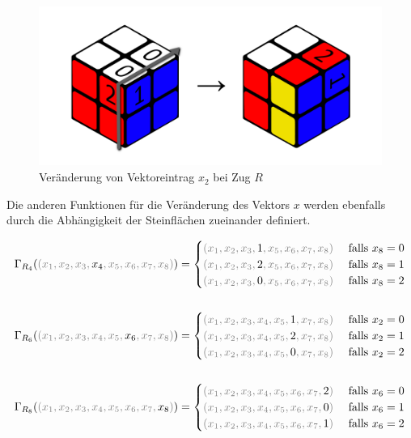 \documentclass[12pt,a4paper, usenames, dvipsnames]{article}
\theoremstyle{mystyle}
\theoremstyle{definition}
\begin{document}
\begin{figure}[H]
\centering
\includegraphics[scale=0.13]{UebergangsfunktionR.png}
\caption{Veränderung von Vektoreintrag $x_2$ bei Zug $R$}
\label{Abbildung_UebergangsfunktionR}
\end{figure}

Die anderen Funktionen für die Veränderung des Vektors $x$ werden ebenfalls durch die Abhängigkeit der Steinflächen zueinander definiert.

\begin{align*}
\Gamma_{R_4}(\textcolor{gray}{(x_1, x_2, x_3, \textcolor{black}{x_4}, x_5, x_6, x_7, x_8  )})= \begin{cases}
\textcolor{gray}{(x_1, x_2, x_3, \textcolor{black}{1}, x_5, x_6, x_7, x_8  )} & \ \text{falls } x_8 = 0 \\ 
\textcolor{gray}{(x_1, x_2, x_3, \textcolor{black}{2}, x_5, x_6, x_7, x_8  )} & \ \text{falls } x_8 = 1 \\
\textcolor{gray}{(x_1, x_2, x_3, \textcolor{black}{0}, x_5, x_6, x_7, x_8  )} & \ \text{falls } x_8 = 2 
\end{cases} \\
\\
\Gamma_{R_6}(\textcolor{gray}{(x_1, x_2, x_3, x_4, x_5, \textcolor{black}{x_6}, x_7, x_8  )})= \begin{cases}
\textcolor{gray}{(x_1, x_2, x_3, x_4, x_5, \textcolor{black}{1}, x_7, x_8  )} & \ \text{falls } x_2 = 0 \\ 
\textcolor{gray}{(x_1, x_2, x_3, x_4, x_5, \textcolor{black}{2}, x_7, x_8  )} & \ \text{falls } x_2 = 1 \\
\textcolor{gray}{(x_1, x_2, x_3, x_4, x_5, \textcolor{black}{0}, x_7, x_8  )} & \ \text{falls } x_2 = 2 
\end{cases} \\
\\
\Gamma_{R_8}(\textcolor{gray}{(x_1, x_2, x_3, x_4, x_5, x_6, x_7, \textcolor{black}{x_8})})= \begin{cases}
\textcolor{gray}{(x_1, x_2, x_3, x_4, x_5, x_6, x_7, \textcolor{black}{2})} & \ \text{falls } x_6 = 0 \\ 
\textcolor{gray}{(x_1, x_2, x_3, x_4, x_5, x_6, x_7, \textcolor{black}{0})} & \ \text{falls } x_6 = 1 \\
\textcolor{gray}{(x_1, x_2, x_3, x_4, x_5, x_6, x_7, \textcolor{black}{1})} & \ \text{falls } x_6 = 2 
\end{cases}
\end{align*}
\end{document}
